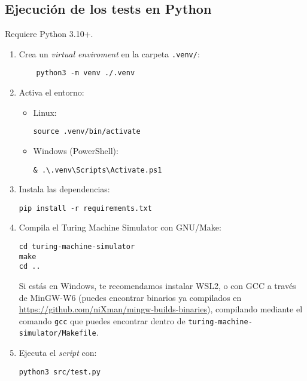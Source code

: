 \subsection*{Ejecución de los tests en Python}
Requiere Python 3.10+.
\begin{enumerate}
  \item Crea un \textit{virtual enviroment} en la carpeta \texttt{.venv/}:
  \begin{verbatim}
    python3 -m venv ./.venv
  \end{verbatim}
  \item Activa el entorno:
  \begin{itemize}
    \item Linux:
    \begin{verbatim}
source .venv/bin/activate
    \end{verbatim}
    \item Windows (PowerShell):
    \begin{verbatim}
& .\.venv\Scripts\Activate.ps1
    \end{verbatim}
  \end{itemize}
  \item Instala las dependencias:
  \begin{verbatim}
pip install -r requirements.txt
  \end{verbatim}
  \item Compila el Turing Machine Simulator\supercite{tmsimulator} con GNU/Make:
  \begin{verbatim}
cd turing-machine-simulator
make
cd ..
  \end{verbatim}
  Si estás en Windows, te recomendamos instalar WSL2, o con GCC a través de MinGW-W6 (puedes encontrar binarios ya compilados en \url{https://github.com/niXman/mingw-builds-binaries}), compilando mediante el comando \texttt{gcc} que puedes encontrar dentro de \texttt{turing-machine-simulator/Makefile}.
  \item Ejecuta el \textit{script} con:
  \begin{verbatim}
python3 src/test.py
  \end{verbatim}
\end{enumerate}
